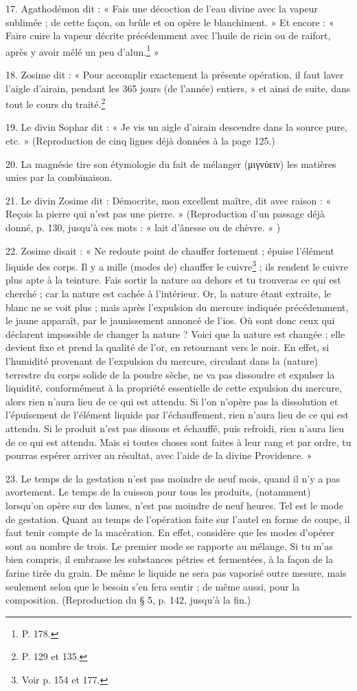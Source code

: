 \documentclass[landscape, a4paper, 11pt, oneside, polutonikogreek, french]{article}
\begin{document}
17. Agathodémon dit : « Fais une décoction de l'eau divine avec la vapeur sublimée ; de cette façon, on brûle et on opère le blanchiment. » Et encore : « Faire cuire la vapeur décrite précédemment avec l'huile de ricin ou de raifort, après y avoir mêlé un peu d'alun.\footnote{P. 178.} »

18. Zosime dit : « Pour accomplir exactement la présente opération, il faut laver l'aigle d'airain, pendant les 365 jours (de l'année) entiers, » et ainsi de suite, dans tout le cours du traité.\footnote{P. 129 et 135.}

19. Le divin Sophar dit : « Je vis un aigle d'airain descendre dans la source pure, etc. » (Reproduction de cinq lignes déjà données à la page 125.)

20. La magnésie tire son étymologie du fait de mélanger (μιγνύειν) les matières unies par la combinaison.

21. Le divin Zosime dit : Démocrite, mon excellent maître, dit avec raison : « Reçois la pierre qui n'est pas une pierre. » (Reproduction d'un passage déjà donné, p. 130, jusqu'à ces mots : « lait d'ânesse ou de chèvre. » )

22. Zosime disait : « Ne redoute point de chauffer fortement ; épuise l'élément liquide des corps. Il y a mille (modes de) chauffer le cuivre\footnote{Voir p. 154 et 177.} ; ils rendent le cuivre plus apte à la teinture. Fais sortir la nature au dehors et tu trouveras ce qui est cherché ; car la nature est cachée à l'intérieur. Or, la nature étant extraite, le blanc ne se voit plus ; mais après l'expulsion du mercure indiquée précédemment, le jaune apparaît, par le jaunissement annoncé de l'ios. Où sont donc ceux qui déclarent impossible de changer la nature ? Voici que la nature est changée ; elle devient fixe et prend la qualité de l'or, en retournant vers le noir. En effet, si l'humidité provenant de l'expulsion du mercure, circulant dans la (nature) terrestre du corps solide de la poudre sèche, ne va pas dissoudre et expulser la liquidité, conformément à la propriété essentielle de cette expulsion du mercure, alors rien n'aura lieu de ce qui est attendu. Si l'on n'opère pas la dissolution et l'épuisement de l'élément liquide par l'échauffement, rien n'aura lieu de ce qui est attendu. Si le produit n'est pas dissous et échauffé, puis refroidi, rien n'aura lieu de ce qui est attendu. Mais si toutes choses sont faites à leur rang et par ordre, tu pourras espérer arriver au résultat, avec l'aide de la divine Providence. »

23. Le temps de la gestation n'est pas moindre de neuf mois, quand il n'y a pas avortement. Le temps de la cuisson pour tous les produits, (notamment) lorsqu'on opère sur des lames, n'est pas moindre de neuf heures. Tel est le mode de gestation. Quant au temps de l'opération faite sur l'autel en forme de coupe, il faut tenir compte de la macération. En effet, considère que les modes d'opérer sont au nombre de trois. Le premier mode se rapporte au mélange. Si tu m'as bien compris, il embrasse les substances pétries et fermentées, à la façon de la farine tirée du grain. De même le liquide ne sera pas vaporisé outre mesure, mais seulement selon que le besoin s'en fera sentir ; de même aussi, pour la composition. (Reproduction du § 5, p. 142, jusqu'à la fin.)
\end{document}
